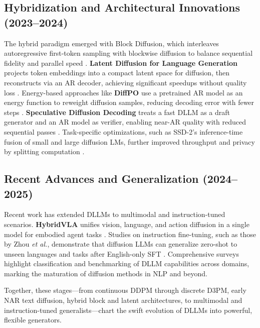 \subsection{Hybridization and Architectural Innovations (2023–2024)}
The hybrid paradigm emerged with \textbf{}{Block Diffusion}, which interleaves autoregressive first-token sampling with blockwise diffusion to balance sequential fidelity and parallel speed \cite{arriola_block_2025}. \textbf{Latent Diffusion for Language Generation} projects token embeddings into a compact latent space for diffusion, then reconstructs via an AR decoder, achieving significant speedups without quality loss \cite{lovelace_latent_2023}. Energy-based approaches like \textbf{DiffPO} use a pretrained AR model as an energy function to reweight diffusion samples, reducing decoding error with fewer steps \cite{xu_energy-based_2025}. \textbf{Speculative Diffusion Decoding} treats a fast DLLM as a draft generator and an AR model as verifier, enabling near-AR quality with reduced sequential passes \cite{christopher_speculative_2025}. Task-specific optimizations, such as SSD-2’s inference-time fusion of small and large diffusion LMs, further improved throughput and privacy by splitting computation \cite{han_david_2024}.

\subsection{Recent Advances and Generalization (2024–2025)}
Recent work has extended DLLMs to multimodal and instruction-tuned scenarios. \textbf{HybridVLA} unifies vision, language, and action diffusion in a single model for embodied agent tasks \cite{liu_hybridvla_2025}. Studies on instruction fine-tuning, such as those by Zhou \emph{et al.}, demonstrate that diffusion LLMs can generalize zero-shot to unseen languages and tasks after English-only SFT \cite{nie_large_2025}. Comprehensive surveys highlight classification and benchmarking of DLLM capabilities across domains, marking the maturation of diffusion methods in NLP and beyond.

Together, these stages—from continuous DDPM through discrete D3PM, early NAR text diffusion, hybrid block and latent architectures, to multimodal and instruction-tuned generalists—chart the swift evolution of DLLMs into powerful, flexible generators.  

% 
% 
